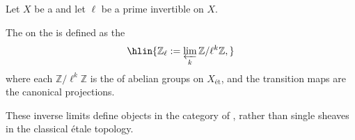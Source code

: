 \begin{definition} \label{definition:ell_adic_sheaf_Z_ell_on_small_etale_site_of_a_scheme}
Let $X$ be a  and let $\ell$ be a prime invertible on $X$.

The   on the  is defined as the 
$$ \hlin{ \mathbb{Z}_\ell := \varprojlim_k \mathbb{Z}/\ell^k \mathbb{Z}, } $$
where each $\mathbb{Z}/\ell^k \mathbb{Z}$ is the  of abelian groups on $X_{\text{ét}}$, and the transition maps are the canonical projections.

These inverse limits define objects in the category of , rather than single sheaves in the classical étale topology. 
\end{definition}